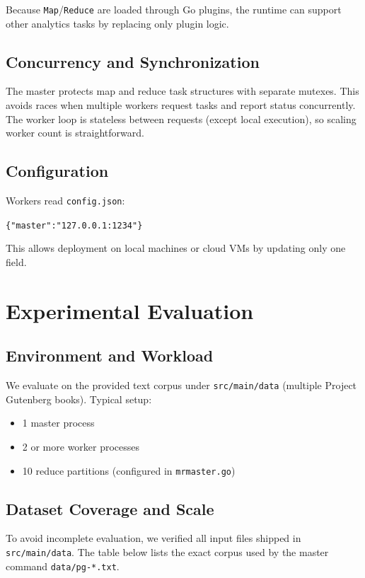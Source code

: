 \documentclass[12pt]{article}
\begin{document}
Because \texttt{Map}/\texttt{Reduce} are loaded through Go plugins, the runtime can support other analytics tasks by replacing only plugin logic.

\subsection{Concurrency and Synchronization}
The master protects map and reduce task structures with separate mutexes. This avoids races when multiple workers request tasks and report status concurrently. The worker loop is stateless between requests (except local execution), so scaling worker count is straightforward.

\subsection{Configuration}
Workers read \texttt{config.json}:
\begin{center}
\texttt{\{"master":"127.0.0.1:1234"\}}
\end{center}
This allows deployment on local machines or cloud VMs by updating only one field.

\section{Experimental Evaluation}
\subsection{Environment and Workload}
We evaluate on the provided text corpus under \texttt{src/main/data} (multiple Project Gutenberg books). Typical setup:
\begin{itemize}[leftmargin=1.5em]
  \item 1 master process
  \item 2 or more worker processes
  \item 10 reduce partitions (configured in \texttt{mrmaster.go})
\end{itemize}

\subsection{Dataset Coverage and Scale}
To avoid incomplete evaluation, we verified all input files shipped in \texttt{src/main/data}. The table below lists the exact corpus used by the master command \texttt{data/pg-*.txt}.
\end{document}
